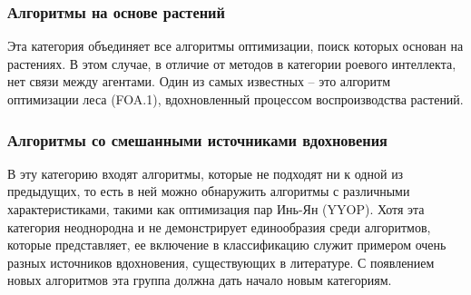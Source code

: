 \subsubsection{Алгоритмы на основе растений}

Эта категория объединяет все алгоритмы оптимизации, поиск которых
основан на растениях. В этом случае, в отличие от методов в категории
роевого интеллекта, нет связи между агентами. Один из самых известных -- это
алгоритм оптимизации леса (FOA.1), вдохновленный процессом
воспроизводства растений.

\subsubsection{Алгоритмы со смешанными источниками вдохновения}

В эту категорию входят алгоритмы, которые не подходят ни к одной из
предыдущих, то есть в ней можно обнаружить алгоритмы с различными
характеристиками, такими как оптимизация пар Инь-Ян (YYOP).
Хотя эта категория неоднородна и не демонстрирует
единообразия среди алгоритмов, которые представляет, ее включение
в классификацию служит примером очень разных источников вдохновения,
существующих в литературе. С появлением новых алгоритмов эта группа
должна дать начало новым категориям.

